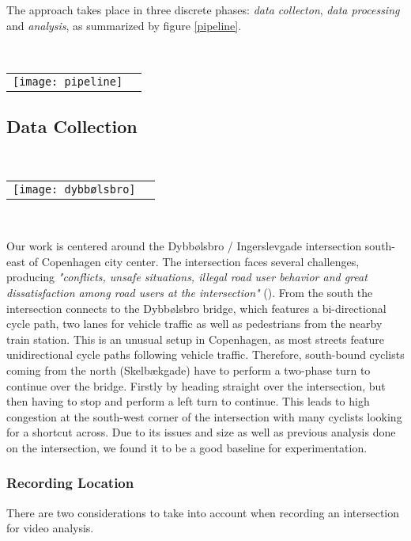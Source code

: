 The approach takes place in three discrete phases: \textit{data collecton}, \textit{data processing} and \textit{analysis}, as summarized
by figure \ref{pipeline}.

\ \\ 
\raggedbottom
\begin{tabular}{@{}cc}
\texttt{[image: pipeline]} 
\end{tabular}
\label{pipeline}

\subsection{Data Collection}
\ \\ 
\noindent
\begin{tabular}{@{}cc}
\texttt{[image: dybbølsbro]}
\end{tabular}
\label{intersection_overview}
\

Our work is centered around the Dybbølsbro / Ingerslevgade intersection south-east of Copenhagen
city center. The intersection faces several challenges, producing \textit{"conflicts, unsafe situations, illegal 
road user behavior and great dissatisfaction among road users at the intersection"} (\cite{CPHpost_2021}).
From the south the intersection connects to the Dybbølsbro bridge, which features a bi-directional cycle path, two
lanes for vehicle traffic as well as pedestrians from the nearby train station. 
This is an unusual setup in Copenhagen, as most streets feature unidirectional cycle paths 
following vehicle traffic. Therefore, south-bound cyclists coming from the north (Skelbækgade) have to perform a two-phase 
turn to continue over the bridge. Firstly by heading straight over the intersection, but then having to stop and perform a left turn to 
continue. This leads to high congestion at the south-west corner of the intersection with many cyclists looking for a shortcut across. 
Due to its issues and size as well as previous analysis done on the intersection, we found it to be a good baseline for experimentation.

\subsubsection{Recording Location}
There are two considerations to take into account when recording an intersection for video analysis.
\ \\

